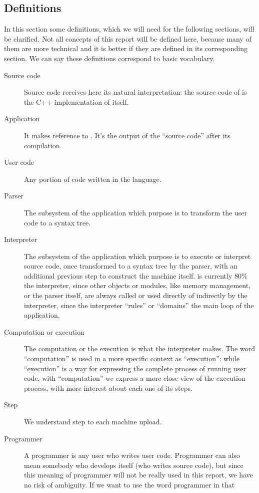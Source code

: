 \documentclass{article}
\begin{document}
\subsection{Definitions}
In this section some definitions, which we will need for the following sections,
will be clarified. Not all concepts of this report will be defined here, because
many of them are more technical and it is better if they are defined in its
corresponding section. We can say these definitions correspond to basic
vocabulary.

\begin{description}
  \item[Source code] Source code receives here its natural interpretation: the
    source code of \fav is the C++ implementation of \fav itself.
  \item[Application] It makes reference to \fav. It's the output of the ``source
    code'' after its compilation.
  \item[User code] Any portion of code written in the \faupp language.
  \item[Parser] The subsystem of the application which purpose is to transform
    the user code to a syntax tree.
  \item[Interpreter] The subsystem of the application which purpose is to
    execute or interpret source code, once transformed to a syntax tree by the
    parser, with an additional previous step to construct the machine
    itself. \fav is currently 80\% the interpreter, since other objects or
    modules, like memory management, or the parser itself, are always called or
    used directly of indirectly by the interpreter, since the interpreter
    ``rules'' or ``domains'' the main loop of the application.
  \item[Computation or execution] The computation or the execution is what the
    interpreter makes. The word ``computation'' is used in a more specific
    context as ``execution'': while ``execution'' is a way for expressing the
    complete process of running user code, with ``computation'' we express a
    more close view of the execution process, with more interest about each one
    of its steps.
  \item[Step] We understand step to each machine upload.
  \item[Programmer] A programmer is any user who writes user code. Programmer
    can also mean somebody who develops \fav itself (who writes source code),
    but since this meaning of programmer will not be really used in this report,
    we have no risk of ambiguity. If we want to use the word programmer in that

\end{description}
\end{document}
